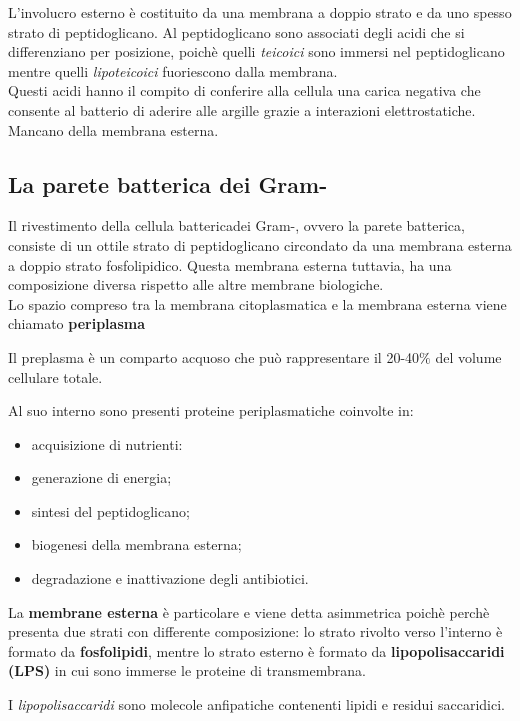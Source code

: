 \documentclass[11pt]{book}
\begin{document}
\vspace{1em}
L'involucro esterno è costituito da una membrana a doppio strato e da uno spesso strato di peptidoglicano. Al peptidoglicano sono associati degli acidi che si differenziano per posizione, poichè quelli \emph{teicoici} sono immersi nel peptidoglicano mentre quelli \emph{lipoteicoici} fuoriescono dalla membrana. \\
Questi acidi hanno il compito di conferire alla cellula una carica negativa che consente al batterio di aderire alle argille grazie a interazioni elettrostatiche.\\
Mancano della membrana esterna.


\subsection{La parete batterica dei Gram-}
Il rivestimento della cellula battericadei Gram-, ovvero la parete batterica, consiste di un ottile strato di peptidoglicano circondato da una membrana esterna a doppio strato fosfolipidico. Questa membrana esterna tuttavia, ha una composizione diversa rispetto alle altre membrane biologiche.\\
Lo spazio compreso tra la membrana citoplasmatica e la membrana esterna viene chiamato \textbf{periplasma}

\vspace{1em}
Il preplasma è un comparto acquoso che può rappresentare il 20-40$\%$ del volume cellulare totale.

Al suo interno sono presenti proteine periplasmatiche coinvolte in: 
\begin{itemize}
\item acquisizione di nutrienti:
\item generazione di energia;
\item sintesi del peptidoglicano;
\item biogenesi della membrana esterna;
\item degradazione e inattivazione degli antibiotici.
\end{itemize}

La \textbf{membrane esterna} è particolare e viene detta asimmetrica poichè perchè presenta due strati con differente composizione: lo strato rivolto verso l'interno è formato da \textbf{fosfolipidi}, mentre lo strato esterno è formato da \textbf{lipopolisaccaridi (LPS) }in cui sono immerse le proteine di transmembrana.

I \emph{lipopolisaccaridi} sono molecole anfipatiche contenenti lipidi e residui saccaridici.
\end{document}
